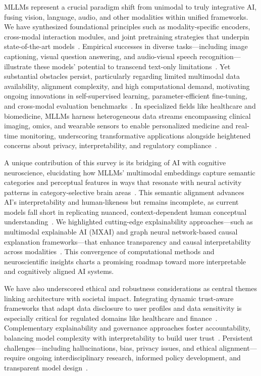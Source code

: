 \documentclass[sigconf]{acmart}
\begin{document}
MLLMs represent a crucial paradigm shift from unimodal to truly integrative AI, fusing vision, language, audio, and other modalities within unified frameworks. We have synthesized foundational principles such as modality-specific encoders, cross-modal interaction modules, and joint pretraining strategies that underpin state-of-the-art models~\cite{ref28}. Empirical successes in diverse tasks—including image captioning, visual question answering, and audio-visual speech recognition—illustrate these models’ potential to transcend text-only limitations~\cite{ref28}. Yet substantial obstacles persist, particularly regarding limited multimodal data availability, alignment complexity, and high computational demand, motivating ongoing innovations in self-supervised learning, parameter-efficient fine-tuning, and cross-modal evaluation benchmarks~\cite{ref28}. In specialized fields like healthcare and biomedicine, MLLMs harness heterogeneous data streams encompassing clinical imaging, omics, and wearable sensors to enable personalized medicine and real-time monitoring, underscoring transformative applications alongside heightened concerns about privacy, interpretability, and regulatory compliance~\cite{ref12,ref21}.

A unique contribution of this survey is its bridging of AI with cognitive neuroscience, elucidating how MLLMs’ multimodal embeddings capture semantic categories and perceptual features in ways that resonate with neural activity patterns in category-selective brain areas~\cite{ref23}. This semantic alignment advances AI’s interpretability and human-likeness but remains incomplete, as current models fall short in replicating nuanced, context-dependent human conceptual understanding~\cite{ref24}. We highlighted cutting-edge explainability approaches—such as multimodal explainable AI (MXAI) and graph neural network-based causal explanation frameworks—that enhance transparency and causal interpretability across modalities~\cite{ref25,ref26}. This convergence of computational methods and neuroscientific insights charts a promising roadmap toward more interpretable and cognitively aligned AI systems.

We have also underscored ethical and robustness considerations as central themes linking architecture with societal impact. Integrating dynamic trust-aware frameworks that adapt data disclosure to user profiles and data sensitivity is especially critical for regulated domains like healthcare and finance~\cite{ref11}. Complementary explainability and governance approaches foster accountability, balancing model complexity with interpretability to build user trust~\cite{ref25,ref28}. Persistent challenges—including hallucinations, bias, privacy issues, and ethical alignment—require ongoing interdisciplinary research, informed policy development, and transparent model design~\cite{ref29,ref30}.
\end{document}
